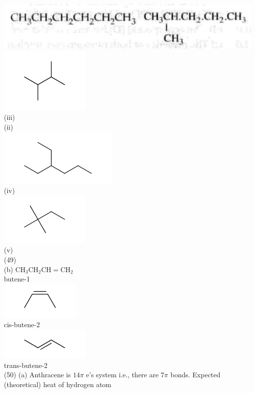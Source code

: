 \documentclass[10pt]{article}
\begin{document}
\includegraphics[max width=\textwidth, center]{2025_01_28_8470952b98110cec3aabg-158(3)}\\
\includegraphics{smile-26314c51d9c51a5d59989dddcd10eb1730f0db6b}\\
(iii)\\
(ii)\\
\includegraphics{smile-24b0d1a87797b35bc785e0fbf9ae08d3b1b35f6a}\\
(iv)\\
\includegraphics{smile-13fa90b2969ba3a40d48fd631106ff3ab5e5ef6b}\\
(v)\\
(49)\\
(b) $\mathrm{CH}_{3} \mathrm{CH}_{2} \mathrm{CH}=\mathrm{CH}_{2}$\\
butene-1\\
\includegraphics{smile-43327f24dbcafe5d73adf68e1913b81aa684e09a}\\
cis-butene-2\\
\includegraphics{smile-897195b5c697d67cd55fe9c447afbbc651f69f35}\\
trans-butene-2\\
(50) (a) Anthracene is $14 \pi$ e's system i.e., there are $7 \pi$ bonds. Expected (theoretical) heat of hydrogen atom
\end{document}
